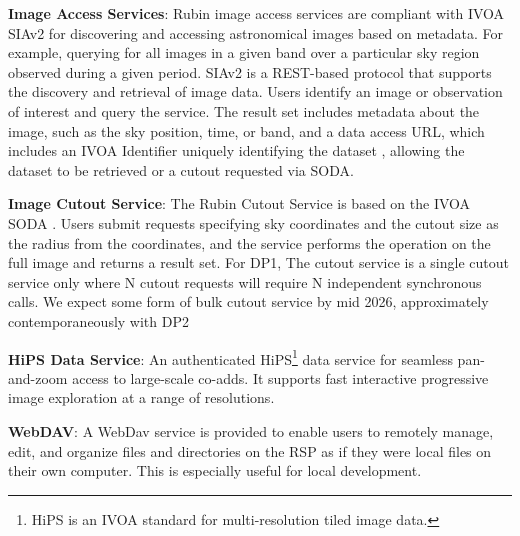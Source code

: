 \vspace{0.1cm}
\textbf{Image Access Services}: Rubin image access services are compliant with \gls{IVOA} SIAv2 \citep[Simple Image Access Protocol, version 2;][]{2025arXiv250100544J,2015ivoa.spec.1223D}
for discovering and accessing astronomical images based on \gls{metadata}.
For example, querying for all images in a given band over a particular sky region observed during a given period.
SIAv2 is a \gls{REST}-based protocol that supports the discovery and retrieval of image data.
Users identify an image or observation of interest and query the service.
The result set includes \gls{metadata} about the image, such as the sky position, time, or band, and a data access URL, which includes an IVOA Identifier uniquely identifying the dataset \citep{DMTN-302}, allowing the dataset to be retrieved or a cutout requested via SODA.

\vspace{0.1cm}
\textbf{Image Cutout Service}: The Rubin Cutout Service \citep{SQR-063, SQR-093} is based on the  \gls{IVOA} SODA \citep[Server-side Operations for Data Access;][]{2017ivoa.spec.0517B}.
Users submit requests specifying sky coordinates and the cutout size as the radius from the coordinates, and the  service performs the operation on the full image and returns a result set.
For DP1, The  cutout service is a single cutout service only where N cutout requests will require N independent synchronous calls. 
We expect some form of bulk cutout service by mid 2026, approximately contemporaneously with \gls{DP2}

\vspace{0.1cm}
\textbf{HiPS Data Service}: An authenticated HiPS\footnote{HiPS is an IVOA standard for multi-resolution tiled image data.} \citep[Hierarchical Progressive Surveys;][]{2017ivoa.spec.0519F} data service for seamless pan-and-zoom access to large-scale co-adds.
It supports fast interactive progressive image exploration at a range of resolutions.

\vspace{0.1cm}
\textbf{WebDAV}: A WebDav service is provided to enable users to remotely manage, edit, and organize files and directories on the RSP as if they were local files on their own computer. This is especially useful for local development.

